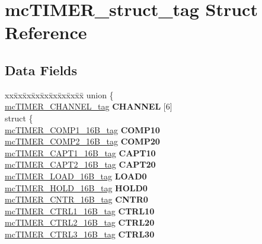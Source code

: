 \hypertarget{structmcTIMER__struct__tag}{}\section{mc\+T\+I\+M\+E\+R\+\_\+struct\+\_\+tag Struct Reference}
\label{structmcTIMER__struct__tag}
\subsection*{Data Fields}
\begin{DoxyCompactItemize}
\item 
\mbox{\label{structmcTIMER__struct__tag_a9208f731429aa6e3f823a40feddff56f}} 
\begin{tabbing}
xx\=xx\=xx\=xx\=xx\=xx\=xx\=xx\=xx\=\kill
union \{\\
\>\mbox{\hyperlink{structmcTIMER__CHANNEL__struct__tag}{mcTIMER\_CHANNEL\_tag}} {\bfseries CHANNEL} \mbox{[}6\mbox{]}\\
\mbox{\label{unionmcTIMER__struct__tag_1_1_0D1942_a03ab1f414d60abe35b2ab1767b692658}} 
\>struct \{\\
\>\>\mbox{\hyperlink{unionmcTIMER__COMP1__16B__tag}{mcTIMER\_COMP1\_16B\_tag}} {\bfseries COMP10}\\
\>\>\mbox{\hyperlink{unionmcTIMER__COMP2__16B__tag}{mcTIMER\_COMP2\_16B\_tag}} {\bfseries COMP20}\\
\>\>\mbox{\hyperlink{unionmcTIMER__CAPT1__16B__tag}{mcTIMER\_CAPT1\_16B\_tag}} {\bfseries CAPT10}\\
\>\>\mbox{\hyperlink{unionmcTIMER__CAPT2__16B__tag}{mcTIMER\_CAPT2\_16B\_tag}} {\bfseries CAPT20}\\
\>\>\mbox{\hyperlink{unionmcTIMER__LOAD__16B__tag}{mcTIMER\_LOAD\_16B\_tag}} {\bfseries LOAD0}\\
\>\>\mbox{\hyperlink{unionmcTIMER__HOLD__16B__tag}{mcTIMER\_HOLD\_16B\_tag}} {\bfseries HOLD0}\\
\>\>\mbox{\hyperlink{unionmcTIMER__CNTR__16B__tag}{mcTIMER\_CNTR\_16B\_tag}} {\bfseries CNTR0}\\
\>\>\mbox{\hyperlink{unionmcTIMER__CTRL1__16B__tag}{mcTIMER\_CTRL1\_16B\_tag}} {\bfseries CTRL10}\\
\>\>\mbox{\hyperlink{unionmcTIMER__CTRL2__16B__tag}{mcTIMER\_CTRL2\_16B\_tag}} {\bfseries CTRL20}\\
\>\>\mbox{\hyperlink{unionmcTIMER__CTRL3__16B__tag}{mcTIMER\_CTRL3\_16B\_tag}} {\bfseries CTRL30}\\

\end{tabbing}
\end{DoxyCompactItemize}
